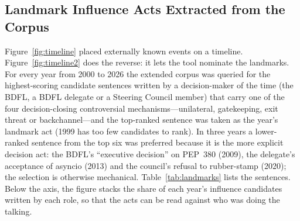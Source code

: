 \subsection{Landmark Influence Acts Extracted from the Corpus}
\label{sec:landmarks}

Figure~\ref{fig:timeline} placed externally known events on a timeline. Figure~\ref{fig:timeline2} does the reverse: it lets the tool nominate the landmarks. For every year from 2000 to 2026 the extended corpus was queried for the highest-scoring candidate sentences written by a decision-maker of the time (the BDFL, a BDFL delegate or a Steering Council member) that carry one of the four decision-closing controversial mechanisms---unilateral, gatekeeping, exit threat or backchannel---and the top-ranked sentence was taken as the year's landmark act (1999 has too few candidates to rank). In three years a lower-ranked sentence from the top six was preferred because it is the more explicit decision act: the BDFL's ``executive decision'' on PEP~380 (2009), the delegate's acceptance of asyncio (2013) and the council's refusal to rubber-stamp (2020); the selection is otherwise mechanical. Table~\ref{tab:landmarks} lists the sentences. Below the axis, the figure stacks the share of each year's influence candidates written by each role, so that the acts can be read against who was doing the talking.


